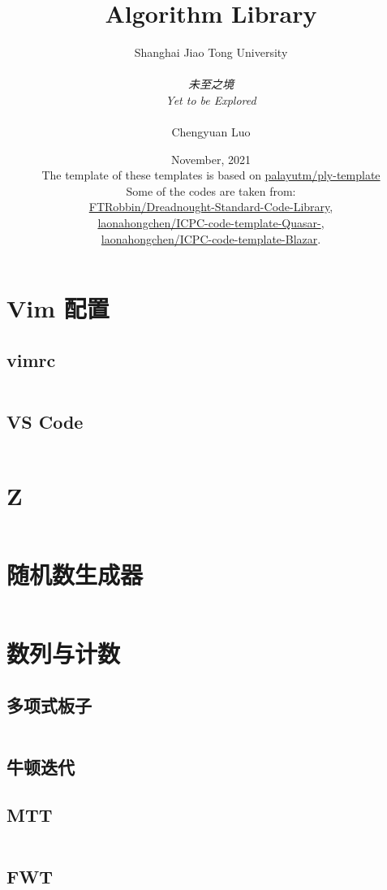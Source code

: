 \documentclass[a4paper,9]{article}
\author{
Shanghai Jiao Tong University\\
\vspace{0cm}\\
\Large{\textit{未至之境}}\\
\Large{\textit{Yet to be Explored}}\\
\vspace{0cm}\\
Chengyuan Luo}
\title{Algorithm Library}
\date{November, 2021\\
\small{\vspace{0.4cm}The template of these templates is based on \href{https://github.com/palayutm/ply-template}{palayutm/ply-template}\\
Some of the codes are taken from:\\
\href{https://github.com/FTRobbin/Dreadnought-Standard-Code-Library}
{FTRobbin/Dreadnought-Standard-Code-Library},\\
\href{https://github.com/laonahongchen/ICPC-code-template-Quasar-}
{laonahongchen/ICPC-code-template-Quasar-},\\
\href{https://github.com/laonahongchen/ICPC-code-template-Blazar}
{laonahongchen/ICPC-code-template-Blazar}.
}}
\begin{document}
\twocolumn  %

\maketitle %
\begingroup
\hypersetup{linkcolor=black}
\tableofcontents %
\endgroup

\section{Vim 配置}
\subsection{vimrc}
\inputminted[breaklines]{vim}{source/vimrc/vimrc}
\subsection{VS Code}
\inputminted[breaklines]{json}{source/vimrc/vscode.json}

\section{Z}
\inputminted[breaklines]{c++}{source/Z/Z.cpp} %

\section{随机数生成器}
\inputminted[breaklines,breakanywhere]{c++}{source/random/rand-gen.cpp}

\section{数列与计数}
\subsection{多项式板子}
\inputminted[breaklines]{c++}{source/sequence/polynomial.cpp}
\subsection{牛顿迭代}

\subsection{MTT}
\inputminted[breaklines]{c++}{source/sequence/mtt.cpp}
\subsection{FWT}
\inputminted[breaklines]{c++}{source/sequence/fwt.cpp}
\end{document}

